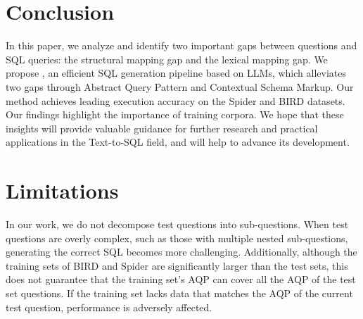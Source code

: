 \section{Conclusion}

In this paper, we analyze and identify two important gaps between questions and SQL queries: the structural mapping gap and the lexical mapping gap. 
We propose \model, an efficient SQL generation pipeline based on LLMs, which alleviates two gaps through Abstract Query Pattern and Contextual Schema Markup. 
Our method achieves leading execution accuracy on the Spider and BIRD datasets. 
Our findings highlight the importance of training corpora. 
We hope that these insights will provide valuable guidance for further research and practical applications in the Text-to-SQL field, and will help to advance its development.

\section{Limitations}
In our work, we do not decompose test questions into sub-questions. When test questions are overly complex, such as those with multiple nested sub-questions, generating the correct SQL becomes more challenging. Additionally, although the training sets of BIRD and Spider are significantly larger than the test sets, this does not guarantee that the training set's AQP can cover all the AQP of the test set questions. If the training set lacks data that matches the AQP of the current test question, performance is adversely affected.